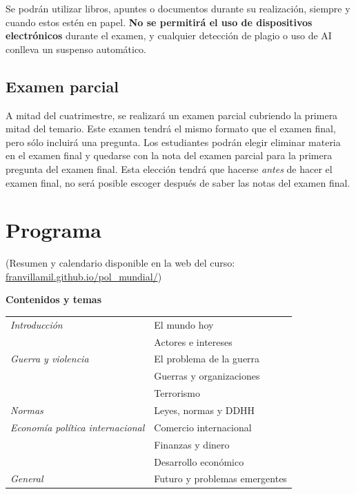 \documentclass[12pt, a4paper]{article}
\begin{document}
Se podrán utilizar libros, apuntes o documentos durante su realización, siempre y cuando estos estén en papel. \textbf{No se permitirá el uso de dispositivos electrónicos} durante el examen, y cualquier detección de plagio o uso de AI conlleva un suspenso automático. %

\subsection*{Examen parcial}

A mitad del cuatrimestre, se realizará un examen parcial cubriendo la primera mitad del temario. Este examen tendrá el mismo formato que el examen final, pero sólo incluirá una pregunta. Los estudiantes podrán elegir eliminar materia en el examen final y quedarse con la nota del examen parcial para la primera pregunta del examen final. Esta elección tendrá que hacerse \textit{antes} de hacer el examen final, no será posible escoger después de saber las notas del examen final.

\section{Programa}

(Resumen y calendario disponible en la web del curso: \href{https://franvillamil.github.io/pol_mundial/}{franvillamil.github.io/pol\_mundial/})

\begin{center}
\textbf{Contenidos y temas}\\\vspace{10pt}
\begin{tabular}{|ll|}
\hline
\textit{\small Introducción} & El mundo hoy \\
  & Actores e intereses \\
\hline
\textit{\small Guerra y violencia} & El problema de la guerra \\
  & Guerras y organizaciones \\
  & Terrorismo \\
\hline
\textit{\small Normas} & Leyes, normas y DDHH \\
\hline
\textit{\small Economía política internacional} & Comercio internacional \\
  & Finanzas y dinero \\
  & Desarrollo económico \\
\hline
\textit{\small General} & Futuro y problemas emergentes \\
\hline
\end{tabular}
\end{center}
\end{document}
